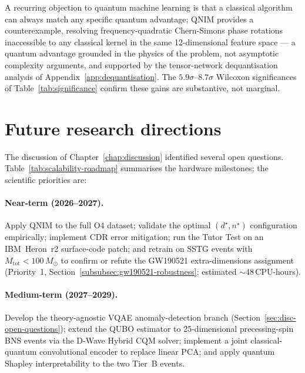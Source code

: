 \documentclass[11pt,a4paper, english]{book}
\theoremstyle{plain}
\theoremstyle{definition}
\numberwithin{equation}{chapter}
\numberwithin{figure}{chapter}
\numberwithin{table}{chapter}
\begin{document}
A recurring objection to quantum machine learning is that a classical
algorithm can always match any specific quantum advantage; QNIM provides
a counterexample, resolving frequency-quadratic Chern-Simons phase
rotations inaccessible to any classical kernel in the same
12-dimensional feature space --- a quantum advantage grounded in the
physics of the problem, not asymptotic complexity arguments, and
supported by the tensor-network dequantisation analysis of
Appendix~\ref{app:dequantisation}. The $5.9\sigma$--$8.7\sigma$
Wilcoxon significances of Table~\ref{tab:significance} confirm these
gains are substantive, not marginal.




\section{Future research directions}
\label{sec:future-work}

The discussion of Chapter~\ref{chap:discussion} identified several open
questions. Table~\ref{tab:scalability-roadmap} summarises the hardware
milestones; the scientific priorities are:

\paragraph{Near-term (2026--2027).}
Apply QNIM to the full O4 dataset; validate the optimal $(d^\star,n^\star)$
configuration empirically; implement CDR error mitigation; run the Tutor Test
on an IBM~Heron~r2 surface-code patch; and retrain on SSTG events with
$M_\mathrm{tot}<100\,M_\odot$ to confirm or refute the GW190521
extra-dimensions assignment (Priority~1,
Section~\ref{subsubsec:gw190521-robustness}; estimated $\sim48$\,CPU-hours).

\paragraph{Medium-term (2027--2029).}
Develop the theory-agnostic VQAE anomaly-detection branch
(Section~\ref{sec:disc-open-questions}); extend the QUBO estimator to
25-dimensional precessing-spin BNS events via the D-Wave Hybrid CQM solver;
implement a joint classical-quantum convolutional encoder to replace linear PCA;
and apply quantum Shapley interpretability to the two Tier~B events.
\end{document}
